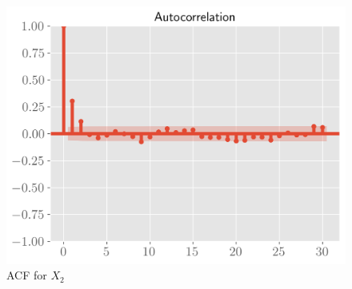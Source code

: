 \documentclass[11pt]{article}
\begin{document}
\begin{figure}[!h]
    \centering
    \includegraphics[scale=.6
    ]{../figures/acf2.png}
    \caption{ACF for $X_2$}
    \label{fig:my_label}
\end{figure}
\end{document}
